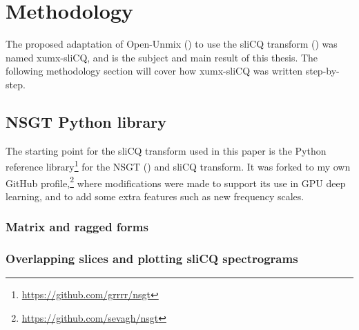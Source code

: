 \documentclass[report.tex]{subfiles}
\begin{document}

\newpagefill

\section{Methodology}

The proposed adaptation of Open-Unmix (\cite{umx}) to use the sliCQ transform (\cite{slicq}) was named xumx-sliCQ, and is the subject and main result of this thesis. The following methodology section will cover how xumx-sliCQ was written step-by-step.

\subsection{NSGT Python library}

The starting point for the sliCQ transform used in this paper is the Python reference library\footnote{\url{https://github.com/grrrr/nsgt}} for the NSGT (\cite{slicq}) and sliCQ transform. It was forked to my own GitHub profile,\footnote{\url{https://github.com/sevagh/nsgt}} where modifications were made to support its use in GPU deep learning, and to add some extra features such as new frequency scales.

\subsubsection{Matrix and ragged forms}


\subsubsection{Overlapping slices and plotting sliCQ spectrograms}


\end{document}
